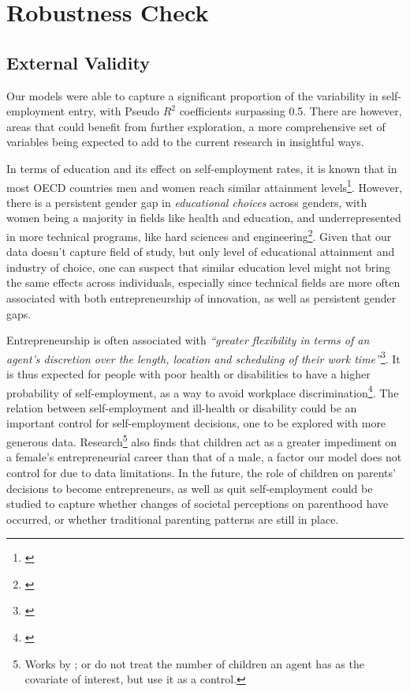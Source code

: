 \section{Robustness Check}

\subsection{External Validity}

Our models were able to capture a significant proportion of the variability in self-employment entry, with Pseudo $R^2$ coefficients surpassing 0.5. There are however, areas that could benefit from further exploration, a more comprehensive set of variables being expected to add to the current research in insightful ways. 

In terms of education and its effect on self-employment rates, it is known that in most OECD countries men and women reach similar attainment levels\footnote{\cite{charles2002equal}}. However, there is a persistent gender gap in \textit{educational choices} across genders, with women being a majority in fields like health and education, and underrepresented in more technical programs, like hard sciences and engineering\footnote{\cite{charles2002equal}}. Given that our data doesn't capture field of study, but only level of educational attainment and industry of choice, one can suspect that similar education level might not bring the same effects across individuals, especially since technical fields are more often associated with both entrepreneurship of innovation, as well as persistent gender gaps. 

Entrepreneurship is often associated with \textit{``greater flexibility in terms of an agent's discretion over the length, location and scheduling of their work time''}\footnote{\cite{Quinn1980}}. It is thus expected for people with poor health or disabilities to have a higher probability of self-employment, as a way to avoid workplace discrimination\footnote{\cite{Quinn1980}}. The relation between self-employment and ill-health or disability could be an important control for self-employment decisions, one to be explored with more generous data. Research\footnote{ Works by \cite{BurkeFitzroyNolan2002}; \cite{GeorgellisWall2005} or \cite{CowlingTaylor2001} do not treat the number of children an agent has as the covariate of interest, but use it as a control.} also finds that children act as a greater impediment on a female's entrepreneurial career than that of a male, a factor our model does not control for due to data limitations. In the future, the role of children on parents' decisions to become entrepreneurs, as well as quit self-employment could be studied to capture whether changes of societal perceptions on parenthood have occurred, or whether traditional parenting patterns are still in place.  

